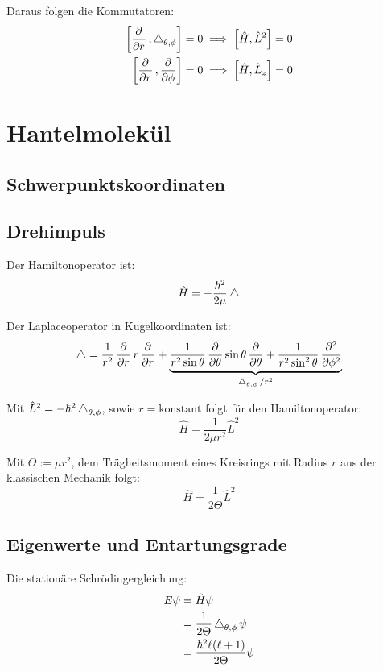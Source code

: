 Daraus folgen die Kommutatoren:
\begin{align*}
	\sbr{\dpd{}r, \laplace_{\theta,\phi}} = 0
	&\implies
	\sbr{\hat H, \hat L^2} = 0 \\
	\sbr{\dpd{}r, \dpd{}\phi} = 0
	&\implies
	\sbr{\hat H, \hat L_z} = 0
\end{align*}


\section{Hantelmolekül}

\subsection{Schwerpunktskoordinaten}

\fehlt

\subsection{Drehimpuls}

Der Hamiltonoperator ist:
\[
	\hat H = - \frac{\hbar^2}{2\mu} \operatorname{\bigtriangleup}
\]

\newcommand\legendrian{\laplace_{\theta,\phi}}

Der Laplaceoperator in Kugelkoordinaten ist:
\[
	\laplace = \frac1{r^2} \dpd{}r r \dpd{}r + \underbrace{\frac1{r^2\sin\theta} \dpd{}\theta \sin\theta \dpd{}\theta + \frac1{r^2\sin^2\theta} \dpd[2]{}\phi}_{\legendrian/r^2}
\]

Mit $\hat L^2 = - \hbar^2 \legendrian$, sowie $r = \text{konstant}$ folgt für
den Hamiltonoperator:
\[
	\hat H = \frac{1}{2\mu r^2} \hat L^2
\]

Mit $\Theta := \mu r^2$, dem Trägheitsmoment eines Kreisrings mit Radius $r$
aus der klassischen Mechanik folgt:
\[
	\hat H = \frac{1}{2\Theta} \hat L^2
\]

\subsection{Eigenwerte und Entartungsgrade}

Die stationäre Schrödingergleichung:
\begin{align*}
	E \psi &= \hat H \psi \\
			  &= \frac1{2\Theta} \legendrian \psi \\
		   &= \frac{\hbar^2 \ell (\ell + 1)}{2 \Theta} \psi
\end{align*}

